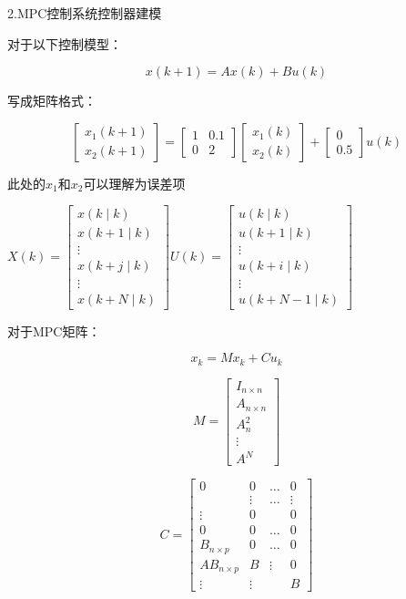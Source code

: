 2.MPC控制系统控制器建模

对于以下控制模型：

$$
x(k+1)=A x(k)+B u(k)
$$

写成矩阵格式：

$$
\left[\begin{array}{l}x_{1}(k+1) \\x_{2}(k+1)\end{array}\right]=\left[\begin{array}{cc}1 & 0.1 \\0 & 2\end{array}\right]\left[\begin{array}{l}x_{1}(k) \\x_{2}(k)\end{array}\right]+\left[\begin{array}{c}0 \\0.5\end{array}\right] u(k)
$$

此处的$x_{1}$和$x_{2}$可以理解为误差项

$X(k)=\left[\begin{array}{c}x(k \mid k) \\x(k+1 \mid k) \\\vdots\\ x(k+j \mid k)\\\vdots \\x(k+N \mid k)\end{array}\right]$$U(k)=\left[\begin{array}{c}u(k \mid k) \\u(k+1 \mid k) \\\vdots\\ u(k+i \mid k)\\\vdots \\u(k+N-1 \mid k)\end{array}\right]$

对于MPC矩阵：

$$
x_{k}=M x_{k}+C u_{k}
$$

$$
M=\left[\begin{array}{c}I_{n \times n} \\A_{n \times n} \\A_{n}^{2} \\\vdots \\A^{N}\end{array}\right]
$$

$$
C=\left[\begin{array}{cccc}
0 & 0 & \ldots & 0 \\
& \vdots & \ldots & \vdots \\
\vdots & 0 & & 0 \\
0 & 0 & \ldots & 0 \\
B_{n \times p} & 0 & \ldots & 0 \\
A B_{n \times p} & B & \vdots & 0 \\
\vdots & \vdots & & B
\end{array}\right]
$$

